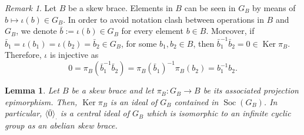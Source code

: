\documentclass[12pt, a4paper, english]{article}
\newtheorem{lema}[teorema]{Lemma}
\theoremstyle{definition}
\theoremstyle{remark}
\newtheorem*{nota}{Remark}
\DeclareMathOperator{\Ker}{Ker}
\DeclareMathOperator{\Soc}{Soc}
\newcommand{\bigcdot}{\boldsymbol{\cdot}}
\begin{document}
\begin{nota}
\label{nota:ker-iota-brace}
Let $B$ be a skew brace. Elements in $B$ can be seen in $G_B$ by means of $b\mapsto \iota(b) \in G_B$. In order to avoid notation clash between operations in $B$ and $G_B$, we denote $\bar{b}:= \iota(b) \in G_B$ for every element $b\in B$. Moreover, if $\bar{b}_1 = \iota(b_1) = \iota(b_2) = \bar{b}_2\in G_B$, for some $b_1,b_2\in B$, then $\bar b_1^{-1}\bar b_2 = 0 \in \Ker \pi_B$. Therefore, $\iota$ is injective as
\[ 0 = \pi_B(\bar b_1^{-1}\bar b_2) = \pi_B(\bar b_1)^{-1}\pi_B(b_2) = b_1^{-1}b_2.\]
\end{nota}


\begin{lema}
\label{lema:kerg-socle}
Let $B$ be a skew brace and let $\pi_B\colon G_B \rightarrow B$ be its associated projection epimorphism. Then, $\Ker \pi_B$ is an ideal of $G_B$ contained in $\Soc(G_B)$. In particular, $\langle \bar{0}\rangle_{\bigcdot}$ is a central ideal of $G_B$ which is isomorphic to an infinite cyclic group as an abelian skew brace.
\end{lema}
\end{document}
